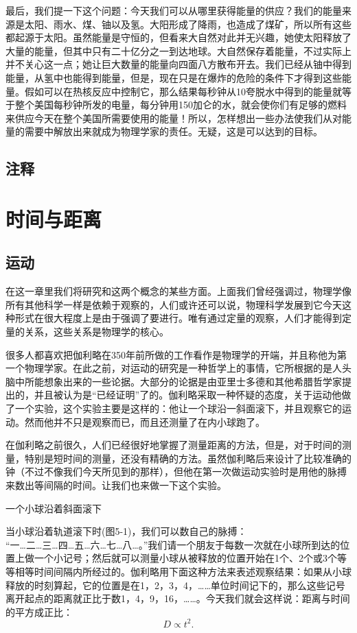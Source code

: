 \documentclass[11pt,oneside]{book}
\begin{document}
\begin{common-format}
最后，我们提一下这个问题：今天我们可以从哪里获得能量的供应？我们的能量来源是太阳、雨水、煤、铀以及氢。大阳形成了降雨，也造成了煤矿，所以所有这些都起源于太阳。虽然能量是守恒的，但看来大自然对此并无兴趣，她使太阳释放了大量的能量，但其中只有二十亿分之一到达地球。大自然保存着能量，不过实际上并不关心这一点；她让巨大数量的能量向四面八方散布开去。我们已经从铀中得到能量，从氢中也能得到能量，但是，现在只是在爆炸的危险的条件下才得到这些能量。假如可以在热核反应中控制它，那么结果每秒钟从10夸脱水中得到的能量就等于整个美国每秒钟所发的电量，每分钟用150加仑的水，就会使你们有足够的燃料来供应今天在整个美国所需要使用的能量！所以，怎样想出一些办法使我们从对能量的需要中解放出来就成为物理学家的责任。无疑，这是可以达到的目标。

\section{注释}
\showendnotes



\chapter{时间与距离}
\section{运动}
在这一章里我们将研究和这两个概念的某些方面。上面我们曾经强调过，物理学像所有其他科学一样是依赖于观察的，人们或许还可以说，物理科学发展到它今天这种形式在很大程度上是由于强调了要进行。唯有通过定量的观察，人们才能得到定量的关系，这些关系是物理学的核心。

很多人都喜欢把伽利略在350年前所做的工作看作是物理学的开端，并且称他为第一个物理学家。在此之前，对运动的研究是一种哲学上的事情，它所根据的是人头脑中所能想象出来的一些论据。大部分的论据是由亚里士多德和其他希腊哲学家提出的，并且被认为是“已经证明”了的。伽利略采取一种怀疑的态度，关于运动他做了一个实验，这个实验主要是这样的：他让一个球沿一斜面滚下，并且观察它的运动。然而他并不只是观察而已，而且还测量了在内小球跑了。

在伽利略之前很久，人们已经很好地掌握了测量距离的方法，但是，对于时间的测量，特别是短时间的测量，还没有精确的方法。虽然伽利略后来设计了比较准确的钟（不过不像我们今天所见到的那样），但他在第一次做运动实验时是用他的脉搏来数出等间隔的时间。让我们也来做一下这个实验。
\begin{fig}{一个小球沿着斜面滚下}
\label{fig:一个小球沿着斜面滚下}
\end{fig}
当小球沿着轨道滚下时(图5-1)，我们可以数自己的脉搏：\\“一…二…三…四…五…六…七…八…。”我们请一个朋友于每数一次就在小球所到达的位置上做一个小记号；然后就可以测量小球从被释放的位置开始在1个、2个或3个等等相等时间间隔内所经过的。伽利略用下面这种方法来表述观察结果：如果从小球释放的时刻算起，它的位置是在1，2，3，4，……单位时间记下的，那么这些记号离开起点的距离就正比于数1，4，9，16，……。今天我们就会这样说：距离与时间的平方成正比：
\begin{equation*}
D\propto t^2.
\end{equation*}


\end{common-format}
\end{document}
